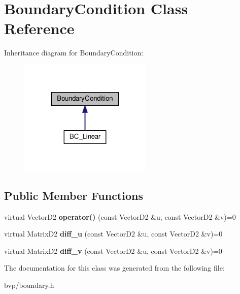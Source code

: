 \hypertarget{classBoundaryCondition}{}\section{Boundary\+Condition Class Reference}
\label{classBoundaryCondition}


Inheritance diagram for Boundary\+Condition\+:
\nopagebreak
\begin{figure}[H]
\begin{center}
\leavevmode
\includegraphics[width=179pt]{classBoundaryCondition__inherit__graph}
\end{center}
\end{figure}
\subsection*{Public Member Functions}
\begin{DoxyCompactItemize}
\item 
\mbox{\label{classBoundaryCondition_aca60bc8b1f7d06912f82680479bd1d08}} 
virtual Vector\+D2 {\bfseries operator()} (const Vector\+D2 \&u, const Vector\+D2 \&v)=0
\item 
\mbox{\label{classBoundaryCondition_ac228bf957db9c75942e824d33ffce226}} 
virtual Matrix\+D2 {\bfseries diff\+\_\+u} (const Vector\+D2 \&u, const Vector\+D2 \&v)=0
\item 
\mbox{\label{classBoundaryCondition_aea4dd11efed142ce9bfc5ba71c15a1c7}} 
virtual Matrix\+D2 {\bfseries diff\+\_\+v} (const Vector\+D2 \&u, const Vector\+D2 \&v)=0
\end{DoxyCompactItemize}


The documentation for this class was generated from the following file\+:\begin{DoxyCompactItemize}
\item 
bvp/boundary.\+h\end{DoxyCompactItemize}
